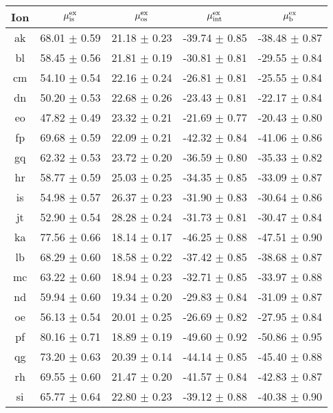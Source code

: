 \begin{table}
 \begin{center}
 \begin{tabular}{ccccc}
  \hline
  \hline
   Ion &   $\mu^{\mathrm{ex}}_{\mathrm{is}}$  &   $\mu^{\mathrm{ex}}_{\mathrm{os}}$  &   $\mu^{\mathrm{ex}}_{\mathrm{int}}$  &   $\mu^{\mathrm{ex}}_{\mathrm{b}}$  \\
  \hline
ak	&	68.01	$\pm$	0.59	&	21.18	$\pm$	0.23	&	-39.74	$\pm$	0.85	&	-38.48	$\pm$	0.87	\\
bl	&	58.45	$\pm$	0.56	&	21.81	$\pm$	0.19	&	-30.81	$\pm$	0.81	&	-29.55	$\pm$	0.84	\\
cm	&	54.10	$\pm$	0.54	&	22.16	$\pm$	0.24	&	-26.81	$\pm$	0.81	&	-25.55	$\pm$	0.84	\\
dn	&	50.20	$\pm$	0.53	&	22.68	$\pm$	0.26	&	-23.43	$\pm$	0.81	&	-22.17	$\pm$	0.84	\\
eo	&	47.82	$\pm$	0.49	&	23.32	$\pm$	0.21	&	-21.69	$\pm$	0.77	&	-20.43	$\pm$	0.80	\\
fp	&	69.68	$\pm$	0.59	&	22.09	$\pm$	0.21	&	-42.32	$\pm$	0.84	&	-41.06	$\pm$	0.86	\\
gq	&	62.32	$\pm$	0.53	&	23.72	$\pm$	0.20	&	-36.59	$\pm$	0.80	&	-35.33	$\pm$	0.82	\\
hr	&	58.77	$\pm$	0.59	&	25.03	$\pm$	0.25	&	-34.35	$\pm$	0.85	&	-33.09	$\pm$	0.87	\\
is	&	54.98	$\pm$	0.57	&	26.37	$\pm$	0.23	&	-31.90	$\pm$	0.83	&	-30.64	$\pm$	0.86	\\
jt	&	52.90	$\pm$	0.54	&	28.28	$\pm$	0.24	&	-31.73	$\pm$	0.81	&	-30.47	$\pm$	0.84	\\
ka	&	77.56	$\pm$	0.66	&	18.14	$\pm$	0.17	&	-46.25	$\pm$	0.88	&	-47.51	$\pm$	0.90	\\
lb	&	68.29	$\pm$	0.60	&	18.58	$\pm$	0.22	&	-37.42	$\pm$	0.85	&	-38.68	$\pm$	0.87	\\
mc	&	63.22	$\pm$	0.60	&	18.94	$\pm$	0.23	&	-32.71	$\pm$	0.85	&	-33.97	$\pm$	0.88	\\
nd	&	59.94	$\pm$	0.60	&	19.34	$\pm$	0.20	&	-29.83	$\pm$	0.84	&	-31.09	$\pm$	0.87	\\
oe	&	56.13	$\pm$	0.54	&	20.01	$\pm$	0.25	&	-26.69	$\pm$	0.82	&	-27.95	$\pm$	0.84	\\
pf	&	80.16	$\pm$	0.71	&	18.89	$\pm$	0.19	&	-49.60	$\pm$	0.92	&	-50.86	$\pm$	0.95	\\
qg	&	73.20	$\pm$	0.63	&	20.39	$\pm$	0.14	&	-44.14	$\pm$	0.85	&	-45.40	$\pm$	0.88	\\
rh	&	69.55	$\pm$	0.60	&	21.47	$\pm$	0.20	&	-41.57	$\pm$	0.84	&	-42.83	$\pm$	0.87	\\
si	&	65.77	$\pm$	0.64	&	22.80	$\pm$	0.23	&	-39.12	$\pm$	0.88	&	-40.38	$\pm$	0.90	\\

\end{tabular}
\end{center}
\end{table}
